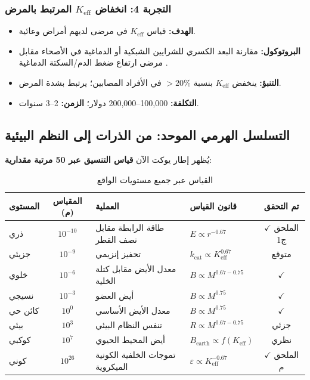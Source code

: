 \documentclass[11pt,a4paper]{article}
\newcommand{\Keff}{K_{\mathrm{eff}}}
\begin{document}
	\subsubsection{التجربة 4: انخفاض \(\Keff\) المرتبط بالمرض}
	\begin{itemize}
		\item \textbf{الهدف:} قياس \(\Keff\) في مرضى لديهم أمراض وعائية.
		\item \textbf{البروتوكول:} مقارنة البعد الكسري للشرايين الشبكية أو الدماغية في الأصحاء مقابل مرضى ارتفاع ضغط الدم/السكتة الدماغية \cite{Gould1993}.
		\item \textbf{التنبؤ:} ينخفض \(\Keff\) بنسبة \(>20\%\) في الأفراد المصابين؛ يرتبط بشدة المرض.
		\item \textbf{التكلفة:} 100,000–200,000 دولار؛ \textbf{الزمن:} 2–3 سنوات.
	\end{itemize}
	
	\subsection{التسلسل الهرمي الموحد: من الذرات إلى النظم البيئية}
	
	يُظهر إطار يوكت الآن \textbf{قياس التنسيق عبر 50 مرتبة مقدارية}:
	
	\begin{table}[htbp]
		\centering
		\caption{القياس عبر جميع مستويات الواقع}
		\label{tab:unified-hierarchy}
		\begin{tabular}{p{3cm} c p{4cm} p{3cm} c}
			\toprule
			\textbf{المستوى} & \textbf{المقياس (م)} & \textbf{العملية} & \textbf{قانون القياس} & \textbf{تم التحقق} \\
			\midrule
			ذري & \(10^{-10}\) & طاقة الرابطة مقابل نصف القطر & \(E \propto r^{-0.67}\) & \(\checkmark\) الملحق ج1 \\
			جزيئي & \(10^{-9}\) & تحفيز إنزيمي & \(k_{\text{cat}} \propto \Keff^{0.67}\) & متوقع \\
			خلوي & \(10^{-6}\) & معدل الأيض مقابل كتلة الخلية & \(B \propto M^{0.67-0.75}\) & \(\checkmark\) \cite{Takemoto2015} \\
			نسيجي & \(10^{-3}\) & أيض العضو & \(B \propto M^{0.75}\) & \(\checkmark\) \cite{West2002} \\
			كائن حي & \(10^{0}\) & معدل الأيض الأساسي & \(B \propto M^{0.75}\) & \(\checkmark\) \cite{Kleiber1932} \\
			بيئي & \(10^{3}\) & تنفس النظام البيئي & \(R \propto M^{0.67-0.75}\) & جزئي \\
			كوكبي & \(10^{7}\) & أيض المحيط الحيوي & \(B_{\text{earth}} \propto f(\Keff)\) & نظري \\
			كوني & \(10^{26}\) & تموجات الخلفية الكونية الميكروية & \(\varepsilon \propto \Keff^{-0.67}\) & \(\checkmark\) الملحق م \\
			\bottomrule
		\end{tabular}
	\end{table}
	
\end{document}
